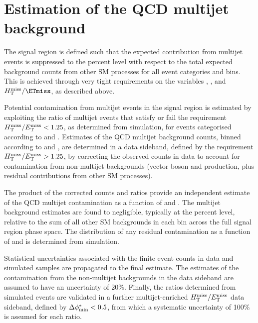 \section{Estimation of the QCD multijet background}
\label{sec:qcd_background}

The signal region is defined such that the expected contribution from
multijet events is suppressed to the percent level with respect to the
total expected background counts from other SM processes for all event
categories and \scalht bins. This is achieved through very tight
requirements on the variables \alphat, \dphi, and $\mht / \ETmiss$, as
described above. 

Potential contamination from multijet events in the signal region is
estimated by exploiting the ratio of multijet events that satisfy or
fail the requirement $H_{\mathrm{T}}^{\text{miss}} / E_{\mathrm{T}}^{\text{miss}} < 1.25$, as determined from simulation,
for events categorised according to \njet and \scalht. Estimates of
the QCD multijet background counts, binned according to \njet and
\scalht, are determined in a data sideband, defined by the requirement
$H_{\mathrm{T}}^{\text{miss}} / E_{\mathrm{T}}^{\text{miss}} > 1.25$, by correcting the observed counts in data to account
for contamination from non-multijet backgrounds (vector boson and
\ttbar production, plus residual contributions from other SM
processes).

The product of the corrected counts and ratios provide an independent
estimate of the QCD multijet contamination as a function of \njet and
\scalht.  The multijet background estimates are found to negligible,
typically at the percent level, relative to the sum of all other SM
backgrounds in each bin across the full signal region phase space. The
distribution of any residual contamination as a function of \nb and
\mht is determined from simulation.

Statistical uncertainties associated with the finite event counts in
data and simulated samples are propagated to the final estimate. The
estimates of the contamination from the non-multijet backgrounds in
the data sideband are assumed to have an uncertainty of 20\%. Finally,
the ratios determined from simulated events are validated in a further
multijet-enriched $H_{\mathrm{T}}^{\text{miss}} / E_{\mathrm{T}}^{\text{miss}}$ data sideband, defined by $\Delta\phi^{*}_{\rm min} < 0.5$,
from which a systematic uncertainty of 100\% is assumed for each
ratio.




